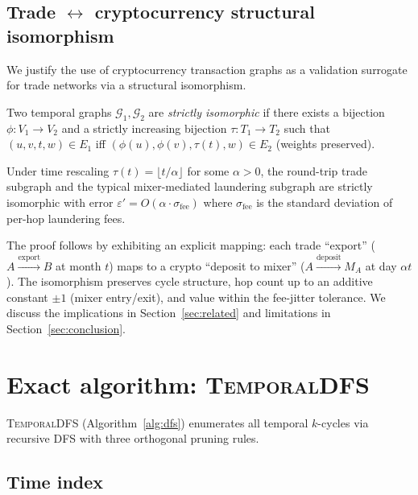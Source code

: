 \documentclass[journal,onecolumn]{IEEEtran}
\newcommand{\G}{\mathcal{G}}
\newcommand{\eps}{\varepsilon}
\begin{document}
\subsection{Trade $\leftrightarrow$ cryptocurrency structural isomorphism}
\label{sec:theory-iso}

We justify the use of cryptocurrency transaction graphs as a validation
surrogate for trade networks via a structural isomorphism.

\begin{definition}
\label{def:iso}
Two temporal graphs $\G_1, \G_2$ are \emph{strictly isomorphic} if there
exists a bijection $\phi: V_1 \to V_2$ and a strictly increasing bijection
$\tau: T_1 \to T_2$ such that $(u, v, t, w) \in E_1$ iff $(\phi(u),
\phi(v), \tau(t), w) \in E_2$ (weights preserved).
\end{definition}

\begin{theorem}
\label{thm:iso}
Under time rescaling $\tau(t) = \lfloor t / \alpha \rfloor$ for some
$\alpha > 0$, the round-trip trade subgraph and the typical mixer-mediated
laundering subgraph are strictly isomorphic with error $\eps' = O(\alpha
\cdot \sigma_{\mathrm{fee}})$ where $\sigma_{\mathrm{fee}}$ is the standard
deviation of per-hop laundering fees.
\end{theorem}

The proof follows by exhibiting an explicit mapping: each trade
``export'' ($A \xrightarrow{\mathrm{export}} B$ at month $t$) maps to a
crypto ``deposit to mixer'' ($A \xrightarrow{\mathrm{deposit}} M_A$ at
day $\alpha t$). The isomorphism preserves cycle structure, hop count up
to an additive constant $\pm 1$ (mixer entry/exit), and value within the
fee-jitter tolerance. We discuss the implications in
Section~\ref{sec:related} and limitations in Section~\ref{sec:conclusion}.

\section{Exact algorithm: \textsc{TemporalDFS}}
\label{sec:exact}

\textsc{TemporalDFS} (Algorithm~\ref{alg:dfs}) enumerates all temporal
$k$-cycles via recursive DFS with three orthogonal pruning rules.

\subsection{Time index}
\label{sec:exact-index}
\end{document}
